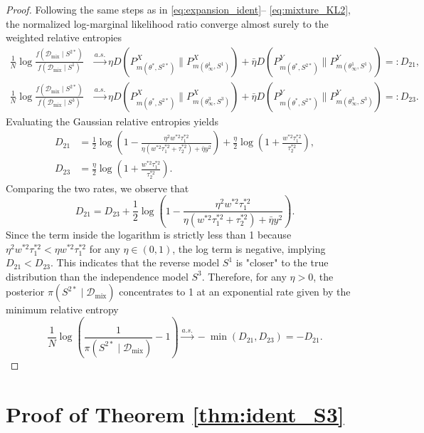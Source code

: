 \documentclass[accepted]{uai2026} %
\newcommand{\train}{\mathcal{D}}
\newcommand{\mixdata}{\train_{\text{mix}}}
\newcommand{\tsone}{\tau_1^{*2}}
\theoremstyle{boldremark}
\begin{document}
\begin{proof}
    Following the same steps as in \eqref{eq:expansion_ident}-- \eqref{eq:mixture_KL2}, the normalized log-marginal likelihood ratio converge almost surely to the weighted relative entropies
    \begin{align*}
        \frac{1}{N} \log \frac{f(\mixdata \mid S^{2*})}{f(\mixdata \mid S^1)} &\xrightarrow{a.s.} \eta D(P_{m(\theta^*, S^{2*})}^X \| P_{m(\theta^1_\infty, S^1)}^X) + \bar{\eta} D(P_{m(\theta^*, S^{2*})}^Y \| P_{m(\theta^1_\infty, S^1)}^Y) =: D_{21}, \\
        \frac{1}{N} \log \frac{f(\mixdata \mid S^{2*})}{f(\mixdata \mid S^3)} &\xrightarrow{a.s.} \eta D(P_{m(\theta^*, S^{2*})}^X \| P_{m(\theta^3_\infty, S^3)}^X) + \bar{\eta} D(P_{m(\theta^*, S^{2*})}^Y \| P_{m(\theta^3_\infty, S^3)}^Y) =: D_{23}.
    \end{align*}
    Evaluating the Gaussian relative entropies yields
    \begin{align}
        D_{21} &= \frac{1}{2}\log \left( 1- \frac{\eta^2 w^{*2}\tau_1^{*2}}{\eta(w^{*2}\tau_1^{*2}+\tau_2^{*2}) +\bar{\eta}y^2}\right) + \frac{\eta}{2}\log\left(1+\frac{w^{*2}\tau_1^{*2}}{\tau_2^{*2}} \right), \\
        D_{23} &= \frac{\eta}{2}\log\left(1+\frac{w^{*2}\tau_1^{*2}}{\tau_2^{*2}} \right).
    \end{align}
    Comparing the two rates, we observe that
    \begin{equation*}
        D_{21} = D_{23} + \frac{1}{2}\log \left( 1- \frac{\eta^2 w^{*2}\tau_1^{*2}}{\eta(w^{*2}\tau_1^{*2}+\tau_2^{*2}) +\bar{\eta}y^2}\right).
    \end{equation*}
    Since the term inside the logarithm is strictly less than 1 because $\eta^2w^{*2}\tsone < \eta w^{*2}\tsone$ for any $\eta \in (0, 1)$, the log term is negative, implying $D_{21} < D_{23}$. This indicates that the reverse model $S^1$ is "closer" to the true distribution than the independence model $S^3$. Therefore, for any $\eta>0$, the posterior $\pi(S^{2*}\mid \mixdata)$ concentrates to 1 at an exponential rate given by the minimum relative entropy
    \begin{equation*}
        \frac{1}{N}\log\left(\frac{1}{\pi(S^{2*} \mid \mixdata)} - 1 \right) \xrightarrow{a.s.} - \min(D_{21}, D_{23}) = -D_{21}.
    \end{equation*}
\end{proof}






\section{Proof of Theorem \ref{thm:ident_S3}}
\end{document}
